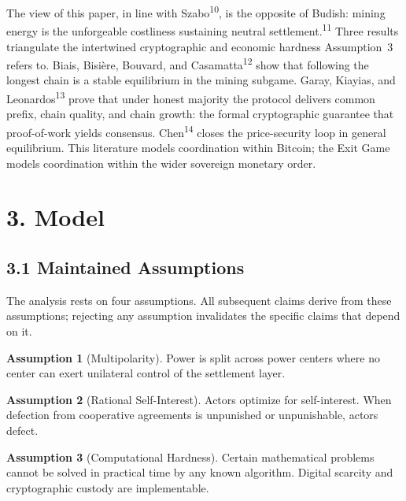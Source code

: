 \documentclass[12pt]{article}
\theoremstyle{definition}
\newtheorem{assumption}{Assumption}
\theoremstyle{remark}
\begin{document}
The view of this paper, in line with Szabo\textsuperscript{10}, is the opposite of Budish: mining energy is the unforgeable costliness sustaining neutral settlement.\textsuperscript{11} Three results triangulate the intertwined cryptographic and economic hardness Assumption~3 refers to. Biais, Bisi\`ere, Bouvard, and Casamatta\textsuperscript{12} show that following the longest chain is a stable equilibrium in the mining subgame. Garay, Kiayias, and Leonardos\textsuperscript{13} prove that under honest majority the protocol delivers common prefix, chain quality, and chain growth: the formal cryptographic guarantee that proof-of-work yields consensus. Chen\textsuperscript{14} closes the price-security loop in general equilibrium. This literature models coordination within Bitcoin; the Exit Game models coordination within the wider sovereign monetary order.


\section{3. Model}

\subsection{3.1 Maintained Assumptions}

The analysis rests on four assumptions. All subsequent claims derive from these assumptions; rejecting any assumption invalidates the specific claims that depend on it.

\begin{assumption}[Multipolarity]
Power is split across power centers where no center can exert unilateral control of the settlement layer.
\end{assumption}

\begin{assumption}[Rational Self-Interest]
Actors optimize for self-interest. When defection from cooperative
agreements is unpunished or unpunishable, actors defect.
\end{assumption}

\begin{assumption}[Computational Hardness]
Certain mathematical problems cannot be solved in practical time by any known algorithm. Digital scarcity and cryptographic custody are implementable.
\end{assumption}
\end{document}
